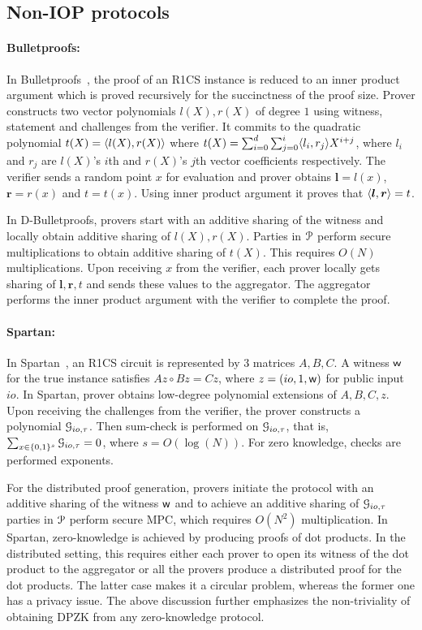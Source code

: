 \subsection{Non-IOP protocols}
\paragraph*{Bulletproofs:}
In Bulletproofs~\cite{bulletproofs}, the proof of an R1CS instance is reduced to an inner product argument which is proved recursively for the succinctness of the proof size. 
Prover constructs two vector polynomials $l(X), r(X)$ of degree $1$ using witness, statement and challenges from the verifier. It commits to the quadratic polynomial $t(X) = \langle l(X),r(X)\rangle$ where $t(X) = \sum_{i=0}^{d} \sum_{j=0}^{i} \langle l_i,r_j\rangle X^{i+j}$, where $l_i$ and $r_j$ are $l(X)$'s $i$th and $r(X)$'s $j$th vector coefficients respectively.
The verifier sends a random point $x$ for evaluation and prover obtains ${\bm l} = l(x)$, ${\bm r} = r(x)$ and $t = t(x)$. Using inner product argument it proves that $\langle {\bm l},{\bm r}\rangle = t$.

In D-Bulletproofs, provers start with an additive sharing of the witness and locally obtain additive sharing of $l(X), r(X)$. Parties in $\mathcal{P}$ perform secure multiplications to obtain additive sharing of $t(X)$. This requires $O(N)$ multiplications. Upon receiving $x$ from the verifier, each prover locally gets sharing of ${\bm l,\bm r}, t$ and sends these values to the aggregator. The aggregator performs the inner product argument with the verifier to complete the proof.

\paragraph*{Spartan:}
In Spartan~\cite{spartan}, an R1CS circuit is represented by 3 matrices $A, B, C$. A witness $\mathsf{w}$ for the true instance satisfies $Az  \circ Bz = Cz$, where $z = (io, 1, \mathsf{w})$ for public input $io$. In Spartan, prover obtains low-degree polynomial extensions of $A, B, C, z$. Upon receiving the challenges from the verifier, the prover constructs a polynomial $\mathcal{G}_{io,\tau}$. Then sum-check is performed on $\mathcal{G}_{io,\tau}$, that is, $\sum_{x\in\{0,1\}^s} \mathcal{G}_{io,\tau} = 0$, where $s = O(\log (N))$. For zero knowledge, checks are performed exponents.

For the distributed proof generation, provers initiate the protocol with an additive sharing of the witness $\mathsf{w}$ and to achieve an additive sharing of $\mathcal{G}_{io,\tau}$ parties in $\mathcal{P}$ perform secure MPC, which requires $O(N^2)$ multiplication. In Spartan, zero-knowledge is achieved by producing proofs of dot products. In the distributed setting, this requires either each prover to open its witness of the dot product to the aggregator or all the provers produce a distributed proof for the dot products. The latter case makes it a circular problem, whereas the former one has a privacy issue. 
The above discussion further emphasizes the non-triviality of obtaining DPZK from any zero-knowledge protocol. 